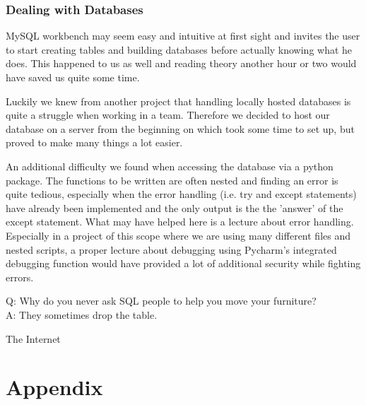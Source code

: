 \documentclass[11pt,a4paper,notitlepage]{article}
\begin{document}
\subsubsection*{Dealing with Databases}
MySQL workbench may seem easy and intuitive at first sight and invites the user to start creating tables and building databases before actually knowing what he does. This happened to us as well and reading theory another hour or two would have saved us quite some time. \par Luckily we knew from another project that handling locally hosted databases is quite a struggle when working in a team. Therefore we decided to host our database on a server from the beginning on which took some time to set up, but proved to make many things a lot easier.\par

An additional difficulty we found when accessing the database via a python package. The functions to be written are often nested and finding an error is quite tedious, especially when the error handling (i.e. try and except statements) have already been implemented and the only output is the the 'answer' of the except statement. What may have helped here is a lecture about error handling. Especially in a project of this scope where we are using many different files and nested scripts, a proper lecture about debugging using Pycharm's integrated debugging function would have provided a lot of additional security while fighting errors.

\epigraph{Q: Why do you never ask SQL people to help you move your furniture?\\ A: They sometimes drop the table.}{The Internet}
\section*{Appendix}
\end{document}
